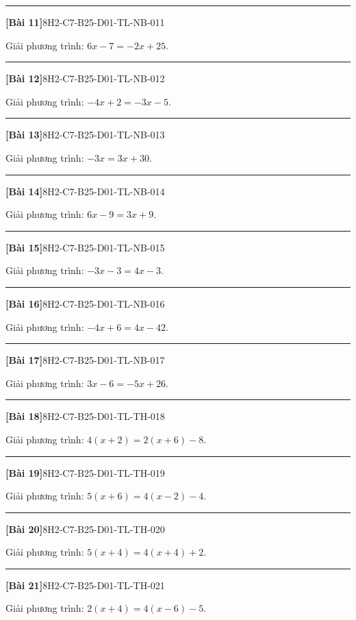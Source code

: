 \documentclass[12pt,a4paper]{article}
\newif\ifloigiai
\newenvironment{cauhoi}[2]{%
  \par\medskip\noindent\rule{\textwidth}{0.4pt}\par\nopagebreak
  \noindent\textbf{[#1]}\hfill{\scriptsize\ttfamily #2}\par\nopagebreak\smallskip}{\par}
\newcommand{\loigiai}[1]{\ifloigiai\par\smallskip\noindent\textit{Lời giải.} #1\par\fi}
\begin{document}
\begin{cauhoi}{Bài 11}{8H2-C7-B25-D01-TL-NB-011}
Giải phương trình: $6x - 7=-2x + 25$.
\loigiai{$6x - 7=-2x + 25$ nên $8x=32$ (chuyển vế), suy ra $x=4$.}
\end{cauhoi}
\begin{cauhoi}{Bài 12}{8H2-C7-B25-D01-TL-NB-012}
Giải phương trình: $-4x + 2=-3x - 5$.
\loigiai{$-4x + 2=-3x - 5$ nên $-x=-7$ (chuyển vế), suy ra $x=7$.}
\end{cauhoi}
\begin{cauhoi}{Bài 13}{8H2-C7-B25-D01-TL-NB-013}
Giải phương trình: $-3x=3x + 30$.
\loigiai{$-3x=3x + 30$ nên $-6x=30$ (chuyển vế), suy ra $x=-5$.}
\end{cauhoi}
\begin{cauhoi}{Bài 14}{8H2-C7-B25-D01-TL-NB-014}
Giải phương trình: $6x - 9=3x + 9$.
\loigiai{$6x - 9=3x + 9$ nên $3x=18$ (chuyển vế), suy ra $x=6$.}
\end{cauhoi}
\begin{cauhoi}{Bài 15}{8H2-C7-B25-D01-TL-NB-015}
Giải phương trình: $-3x - 3=4x - 3$.
\loigiai{$-3x - 3=4x - 3$ nên $-7x=0$ (chuyển vế), suy ra $x=0$.}
\end{cauhoi}
\begin{cauhoi}{Bài 16}{8H2-C7-B25-D01-TL-NB-016}
Giải phương trình: $-4x + 6=4x - 42$.
\loigiai{$-4x + 6=4x - 42$ nên $-8x=-48$ (chuyển vế), suy ra $x=6$.}
\end{cauhoi}
\begin{cauhoi}{Bài 17}{8H2-C7-B25-D01-TL-NB-017}
Giải phương trình: $3x - 6=-5x + 26$.
\loigiai{$3x - 6=-5x + 26$ nên $8x=32$ (chuyển vế), suy ra $x=4$.}
\end{cauhoi}
\begin{cauhoi}{Bài 18}{8H2-C7-B25-D01-TL-TH-018}
Giải phương trình: $4(x + 2)=2(x + 6)-8$.
\loigiai{Khai triển hai vế: $4x + 8=2x + 4$. Chuyển vế, thu gọn ta được $2x=-4$, suy ra $x=-2$.}
\end{cauhoi}
\begin{cauhoi}{Bài 19}{8H2-C7-B25-D01-TL-TH-019}
Giải phương trình: $5(x + 6)=4(x - 2)-4$.
\loigiai{Khai triển hai vế: $5x + 30=4x - 12$. Chuyển vế, thu gọn ta được $x=-42$, suy ra $x=-42$.}
\end{cauhoi}
\begin{cauhoi}{Bài 20}{8H2-C7-B25-D01-TL-TH-020}
Giải phương trình: $5(x + 4)=4(x + 4)+2$.
\loigiai{Khai triển hai vế: $5x + 20=4x + 18$. Chuyển vế, thu gọn ta được $x=-2$, suy ra $x=-2$.}
\end{cauhoi}
\begin{cauhoi}{Bài 21}{8H2-C7-B25-D01-TL-TH-021}
Giải phương trình: $2(x + 4)=4(x - 6)-5$.
\loigiai{Khai triển hai vế: $2x + 8=4x - 29$. Chuyển vế, thu gọn ta được $-2x=-37$, suy ra $x=\dfrac{37}{2}$.}
\end{cauhoi}
\end{document}
